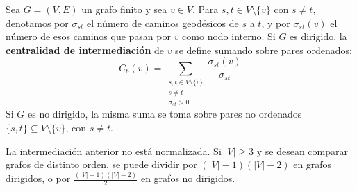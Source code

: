             \begin{definicion}
                Sea $G=(V,E)$ un grafo finito y sea $v\in V$. Para $s,t\in V\setminus\{v\}$ con $s\neq t$, denotamos por $\sigma_{st}$ el número de caminos geodésicos de $s$ a $t$, y por $\sigma_{st}(v)$ el número de esos caminos que pasan por $v$ como nodo interno. Si $G$ es dirigido, la \textbf{centralidad de intermediación} de $v$ se define sumando sobre pares ordenados:
                \[
                C_b(v) = \sum_{\substack{s,t\in V\setminus\{v\}\\ s\neq t\\ \sigma_{st}>0}} \frac{\sigma_{st}(v)}{\sigma_{st}}
                \]
                Si $G$ es no dirigido, la misma suma se toma sobre pares no ordenados $\{s,t\}\subseteq V\setminus\{v\}$, con $s\neq t$.
            \end{definicion}

            \begin{observacion}
                La intermediación anterior no está normalizada. Si $|V|\ge 3$ y se desean comparar grafos de distinto orden, se puede dividir por $(|V|-1)(|V|-2)$ en grafos dirigidos, o por $\frac{(|V|-1)(|V|-2)}{2}$ en grafos no dirigidos.
            \end{observacion}

